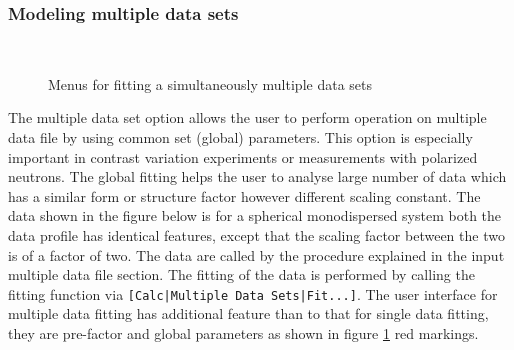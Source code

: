 \subsubsection{Modeling multiple data sets}~\\
\begin{figure}[htb]
\centering
{}
\hfill
{}
\caption{Menus for fitting a simultaneously multiple data sets}
\label{fig:QTmultiplefit}
\end{figure}
The multiple data set option allows the user to perform operation on
multiple data file by using common set (global) parameters. This
option is especially important in contrast variation experiments or
measurements with polarized neutrons. The global fitting helps the
user to analyse large number of data which has a similar form or
structure factor however different scaling constant. The data shown
in the figure below is for a spherical monodispersed system both the
data profile has identical features, except that the scaling factor
between the two is of a factor of two. The data are called by the
procedure explained in the input multiple data file section. The
fitting of the data is performed by calling the fitting function via
\verb"[Calc|Multiple Data Sets|Fit...]". The user interface for multiple
data fitting has additional feature than to that for single data
fitting, they are pre-factor and global parameters as shown in
figure \ref{fig:QTmultiplefit} red markings.



